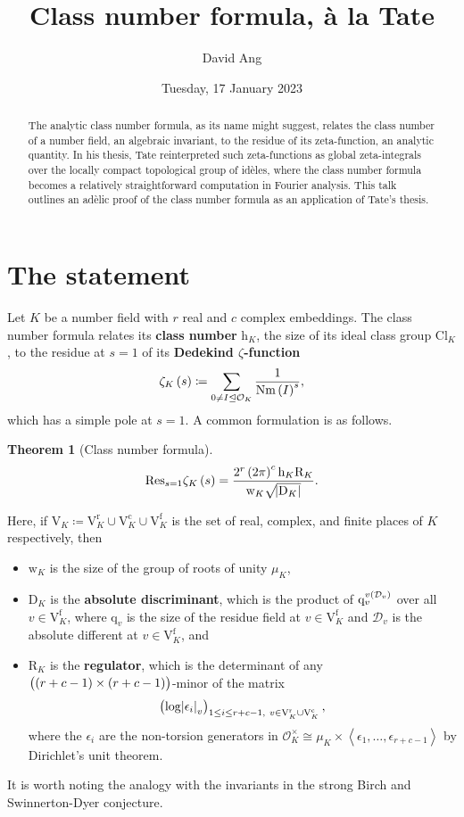 \documentclass{article}
\title{Class number formula, \`a la Tate}
\author{David Ang}
\date{Tuesday, 17 January 2023}
\newtheorem*{theorem}{Theorem}
\newcommand{\1}{\mathbbm{1}}
\newcommand{\br}{\del}
\renewcommand{\c}{\mathrm{c}}
\newcommand{\Cl}{\mathrm{Cl}}
\newcommand{\D}{\mathrm{D}}
\newcommand{\DDD}{\mathcal{D}}
\newcommand{\f}{\mathrm{f}}
\newcommand{\h}{\mathrm{h}}
\newcommand{\Nm}{\mathrm{Nm}}
\newcommand{\OOO}{\mathcal{O}}
\newcommand{\q}{\mathrm{q}}
\renewcommand{\r}{\mathrm{r}}
\newcommand{\R}{\mathrm{R}}
\newcommand{\Res}{\mathrm{Res}}
\newcommand{\V}{\mathrm{V}}
\newcommand{\w}{\mathrm{w}}
\newcommand{\abr}[1]{\left\langle #1 \right\rangle}
\begin{document}
\maketitle

\begin{abstract}
The analytic class number formula, as its name might suggest, relates the class number of a number field, an algebraic invariant, to the residue of its zeta-function, an analytic quantity. In his thesis, Tate reinterpreted such zeta-functions as global zeta-integrals over the locally compact topological group of id\`eles, where the class number formula becomes a relatively straightforward computation in Fourier analysis. This talk outlines an ad\`elic proof of the class number formula as an application of Tate's thesis.
\end{abstract}

\section{The statement}

Let $ K $ be a number field with $ r $ real and $ c $ complex embeddings. The class number formula relates its \textbf{class number} $ \h_K $, the size of its ideal class group $ \Cl_K $, to the residue at $ s = 1 $ of its \textbf{Dedekind $ \zeta $-function}
$$ \zeta_K\br{s} \coloneqq \sum_{0 \ne I \trianglelefteq \OOO_K} \dfrac{1}{\Nm\br{I}^s}, $$
which has a simple pole at $ s = 1 $. A common formulation is as follows.

\begin{theorem}[Class number formula]
$$ \Res_{s = 1} \zeta_K\br{s} = \dfrac{2^{r}\br{2\pi}^{c}\h_K\R_K}{\w_K\sqrt{\abs{\D_K}}}. $$
\end{theorem}

Here, if $ \V_K \coloneqq \V_K^\r \cup \V_K^\c \cup \V_K^\f $ is the set of real, complex, and finite places of $ K $ respectively, then
\begin{itemize}
\item $ \w_K $ is the size of the group of roots of unity $ \mu_K $,
\item $ \D_K $ is the \textbf{absolute discriminant}, which is the product of $ \q_v^{v\br{\DDD_v}} $ over all $ v \in \V_K^\f $, where $ \q_v $ is the size of the residue field at $ v \in \V_K^\f $ and $ \DDD_v $ is the absolute different at $ v \in \V_K^\f $, and
\item $ \R_K $ is the \textbf{regulator}, which is the determinant of any $ \br{\br{r + c - 1} \times \br{r + c - 1}} $-minor of the matrix
$$ \br{\log \abs{\epsilon_i}_v}_{1 \le i \le r + c - 1, \ v \in \V_K^\r \cup \V_K^\c}, $$
where the $ \epsilon_i $ are the non-torsion generators in $ \OOO_K^\times \cong \mu_K \times \abr{\epsilon_1, \dots, \epsilon_{r + c - 1}} $ by Dirichlet's unit theorem.
\end{itemize}
It is worth noting the analogy with the invariants in the strong Birch and Swinnerton-Dyer conjecture.
\end{document}
